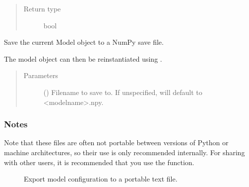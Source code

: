 \documentclass[letterpaper,10pt,english]{sphinxmanual}
\begin{document}
\begin{fulllineitems}
\begin{fulllineitems}
\begin{quote}
\begin{description}
\item[{Return type}] \leavevmode
bool

\end{description}\end{quote}

\end{fulllineitems}


\begin{fulllineitems}
\label{\detokenize{source/exoplasim:exoplasim.Model.save}}
Save the current Model object to a NumPy save file.

The model object can then be reinstantiated using .
\begin{quote}\begin{description}
\item[{Parameters}] \leavevmode
{} (\sphinxstyleliteralemphasis{\sphinxupquote{, }}) \textendash{} Filename to save to. If unspecified, will default to \textless{}modelname\textgreater{}.npy.

\end{description}\end{quote}
\subsubsection*{Notes}

Note that these files are often not portable between versions of Python or machine architectures, so their use is only recommended internally. For sharing with other
users, it is recommended that you use the  function.



\begin{description}
\item[{{\hyperref[\detokenize{source/exoplasim:exoplasim.Model.exportcfg}]{}}}] \leavevmode
Export model configuration to a portable text file.

\end{description}



\end{fulllineitems}


\end{fulllineitems}
\end{document}
